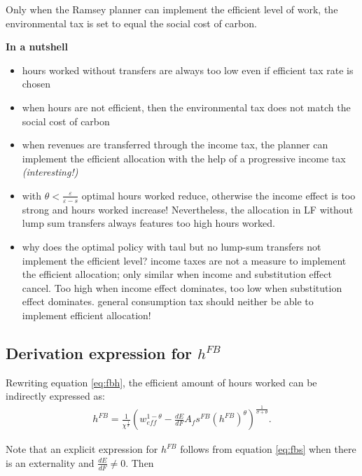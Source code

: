 Only when the Ramsey planner can implement the efficient level of work, the environmental tax is set to equal the social cost of carbon.   




\textbf{In a nutshell}
\begin{itemize}
	\item hours worked without transfers are always too low even if efficient tax rate is chosen
	\item when hours are not efficient, then the environmental tax does not match the social cost of carbon
	\item when revenues are transferred through the income tax, the planner can implement the efficient allocation with the help of a progressive income tax \textit{(interesting!)}
	\item with $\theta<\frac{\varepsilon}{\varepsilon-s}$ optimal hours worked reduce, otherwise the income effect is too strong and hours worked increase! 
	Nevertheless, the allocation in LF without lump sum transfers always features too high hours worked. 
	\item why does the optimal policy with taul but no lump-sum transfers not implement the efficient level? \ar income taxes are not a measure to implement the efficient allocation; only similar when income and substitution effect cancel. Too high when income effect dominates, too low when substitution effect dominates.
	\ar general consumption tax should neither be able to implement efficient allocation! 
\end{itemize}


\subsection{Derivation expression for $h^{FB}$}
Rewriting equation \ref{eq:fbh}, the efficient amount of hours worked can be indirectly expressed as:
\begin{align}
h^{FB}=\frac{1}{\chi^\frac{1}{\sigma}}\left(w_{eff}^{1-\theta}-\frac{dE}{dF}A_f s^{FB}\left(h^{FB}\right)^\theta \right)^\frac{1}{\sigma+\theta}.\label{eq:heff_1}
\end{align}

Note that an explicit expression for $h^{FB}$ follows from equation \ref{eq:fbs} when there is an externality and $\frac{dE}{dF}\neq 0$. Then 


